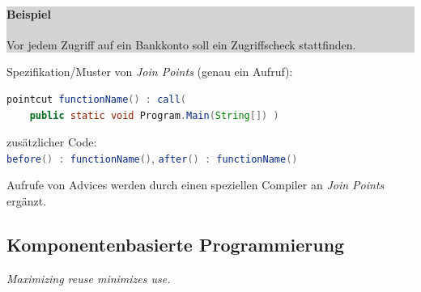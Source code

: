 \documentclass[a4paper,fontsize=9pt, DIV=calc]{scrartcl}
\begin{document}
\begin{multicols}{2}
\colorbox{lightgrey}{
    \begin{minipage}{0.95\linewidth} \color{black} \sffamily
        \paragraph{Beispiel} \textcolor{siemensblue}{Vor jedem Zugriff auf ein Bankkonto} soll ein \textcolor{siemensred}{Zugriffscheck} stattfinden.
        \end{minipage}
}

\begin{description}[leftmargin=*]
    \item[\textcolor{siemensblue}{Point Cuts}] Spezifikation/Muster von \textcolor{siemensorange}{\textit{Join Points} (genau ein Aufruf)}:
    
\begin{lstlisting}[style=siemens, language=Java]
pointcut functionName() : call(
    public static void Program.Main(String[]) )
\end{lstlisting}
    \item[\textcolor{siemensred}{Advices}] zusätzlicher Code:\\\lstinline[style=siemens, language=Java]{before() : functionName()}, \lstinline[style=siemens, language=Java]{after() : functionName()}
    \item[Weaving] Aufrufe von Advices werden durch einen speziellen Compiler an \textit{\textcolor{siemensorange}{Join Points}} ergänzt.
\end{description}


\begin{multicols}{2}
\subsection[Komponentenbasierte Programmierung]{\textcolor{siemensgreen}{Komponentenbasierte Programmierung}}
 \textit{Maximizing reuse minimizes use.}


\end{multicols}
\end{multicols}
\end{document}
